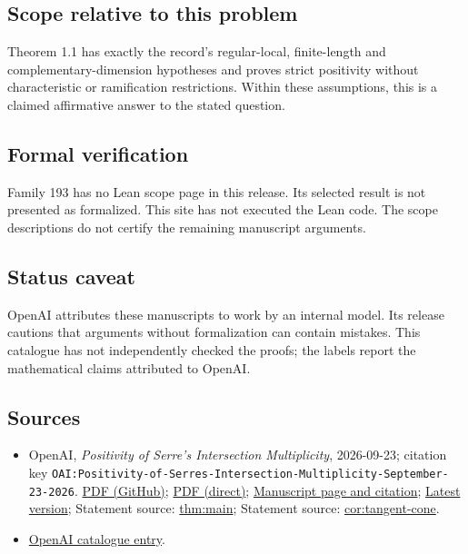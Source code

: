 \documentclass[11pt]{article}
\begin{document}
\subsection{Scope relative to this problem}
Theorem 1.1 has exactly the record’s regular-local, finite-length and complementary-dimension hypotheses and proves strict positivity without characteristic or ramification restrictions. Within these assumptions, this is a claimed affirmative answer to the stated question.

\subsection{Formal verification}
Family 193 has no Lean scope page in this release. Its selected result is not presented as formalized. This site has not executed the Lean code. The scope descriptions do not certify the remaining manuscript arguments.

\subsection{Status caveat}
OpenAI attributes these manuscripts to work by an internal model. Its release cautions that arguments without formalization can contain mistakes. This catalogue has not independently checked the proofs; the labels report the mathematical claims attributed to OpenAI.

\subsection{Sources}
\begin{itemize}
\item OpenAI, \emph{Positivity of Serre's Intersection Multiplicity}, 2026-09-23; citation key \texttt{OAI:Positivity-of-Serres-Intersection-Multiplicity-September-23-2026}. \href{https://github.com/openai/math/blob/adc7f1241b42e322a6451854ab7e4b4c146bf78a/preprints/Positivity-of-Serres-Intersection-Multiplicity-September-23-2026/paper.pdf}{PDF (GitHub)}; \href{https://github.com/openai/math/raw/adc7f1241b42e322a6451854ab7e4b4c146bf78a/preprints/Positivity-of-Serres-Intersection-Multiplicity-September-23-2026/paper.pdf}{PDF (direct)}; \href{https://github.com/openai/math/blob/adc7f1241b42e322a6451854ab7e4b4c146bf78a/preprints/Positivity-of-Serres-Intersection-Multiplicity-September-23-2026/README.md}{Manuscript page and citation}; \href{https://github.com/openai/math/blob/main/preprints/Positivity-of-Serres-Intersection-Multiplicity-September-23-2026/paper.pdf}{Latest version}; Statement source: \href{https://github.com/openai/math/blob/adc7f1241b42e322a6451854ab7e4b4c146bf78a/preprints/Positivity-of-Serres-Intersection-Multiplicity-September-23-2026/build/sections/introduction.tex\#L16}{thm:main}; Statement source: \href{https://github.com/openai/math/blob/adc7f1241b42e322a6451854ab7e4b4c146bf78a/preprints/Positivity-of-Serres-Intersection-Multiplicity-September-23-2026/build/sections/introduction.tex\#L200}{cor:tangent-cone}.
\item \href{https://github.com/openai/math/blob/adc7f1241b42e322a6451854ab7e4b4c146bf78a/CONTENTS.md}{OpenAI catalogue entry}.
\end{itemize}
\end{document}
